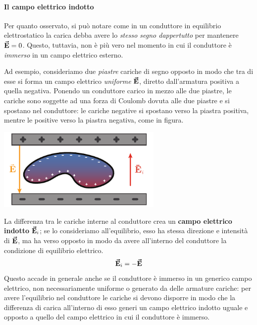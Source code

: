 \paragraph{Il campo elettrico indotto}
Per quanto osservato, si può notare come in un conduttore in equilibrio elettrostatico la carica debba avere lo \textit{stesso segno dappertutto} per mantenere $\vb*{\va{E}}=0$. Questo, tuttavia, non è più vero nel momento in cui il conduttore è \textit{immerso} in un campo elettrico esterno.

Ad esempio, consideriamo due \textit{piastre} cariche di segno opposto in modo che tra di esse si forma un campo elettrico \textit{uniforme} $\vb*{\va{E}}$, diretto dall'armatura positiva a quella negativa.
Ponendo un conduttore carico in mezzo alle due piastre, le cariche sono soggette ad una forza di Coulomb dovuta alle due piastre e si spostano nel conduttore: le cariche negative si spostano verso la piastra positiva, mentre le positive verso la piastra negativa, come in figura.
\begin{center}
	\includegraphics[width=0.6\textwidth]{images/chp4campoindotto.pdf}
\end{center}
La differenza tra le cariche interne al conduttore crea un \textbf{campo elettrico indotto} $\vb*{\va{E}}_i$; se lo consideriamo all'equilibrio, esso ha stessa direzione e intensità di $\vb*{\va{E}}$, ma ha verso opposto in modo da avere all'interno del conduttore la condizione di equilibrio elettrico.
\begin{equation}
	\vb*{\va{E}}_i=-\vb*{\va{E}}
\end{equation}
Questo accade in generale anche se il conduttore è immerso in un generico campo elettrico, non necessariamente uniforme o generato da delle armature cariche: per avere l'equilibrio nel conduttore le cariche si devono disporre in modo che la differenza di carica all'interno di esso generi un campo elettrico indotto uguale e opposto a quello del campo elettrico in cui il conduttore è immerso.
